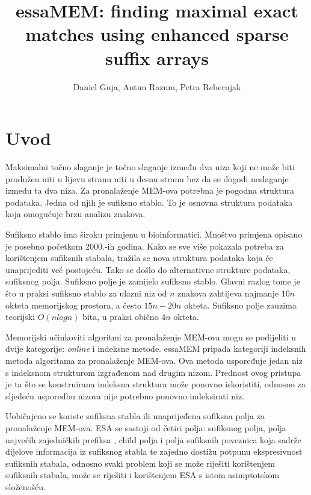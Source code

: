 \documentclass[times, utf8, seminar, numeric]{fer}
\begin{document}
\title{essaMEM: finding maximal exact matches using enhanced sparse suffix arrays}
\author{Daniel Guja, Antun Razum, Petra Rebernjak}

\maketitle
\tableofcontents

\chapter{Uvod}
Maksimalni točno slaganje  je točno slaganje između dva niza koji ne može biti produžen niti u lijevu stranu niti u desnu stranu bez da se dogodi neslaganje između ta dva niza. Za pronalaženje MEM-ova potrebna je pogodna struktura podataka. Jedna od njih je sufiksno stablo. To je osnovna struktura podataka koja omogućuje brzu analizu znakova. 

Sufiksno stablo ima široku primjenu u bioinformatici. Mnoštvo primjena opisano je posebno početkom 2000.-ih godina. Kako se sve više pokazala potreba za korištenjem sufiksnih stabala, tražila se nova struktura podataka koja će unaprijediti već postojeću. Tako se došlo do alternativne strukture podataka, sufiksnog polja. Sufiksno polje je zamijelo sufiksno stablo. Glavni razlog tome je što u praksi sufiksno stablo za ulazni niz od $n$ znakova zahtijeva najmanje $10n$ okteta memorijskog prostora, a često $15n-20n$ okteta. Sufiksno polje zauzima teorijski $O(n log n)$ bita, u praksi obično $4n$ okteta.

Memorijski učinkoviti algoritmi za pronalaženje MEM-ova mogu se podijeliti u dvije kategorije: \textit{online} i indeksne metode. essaMEM pripada kategoriji indeksnih metoda algoritama za pronalaženje MEM-ova. Ova metoda uspoređuje jedan niz s indeksnom strukturom izgrađenom nad drugim nizom. Prednost ovog pristupa je ta što se konstruirana indeksna struktura može ponovno iskoristiti, odnosno za sljedeću usporedbu nizova nije potrebno ponovno indeksirati niz. 

Uobičajeno se koriste sufiksna stabla ili unaprijeđena sufiksna polja  za pronalaženje MEM-ova. ESA se sastoji od četiri polja: sufiksnog polja, polja najvećih zajedničkih prefiksa , child polja i polja sufiksnih poveznica  koja sadrže dijelove informacija iz sufiksnog stabla te zajedno dostižu potpunu ekspresivnost sufiksnih stabala, odnosno svaki problem koji se može riješiti korištenjem sufiksnih stabala, može se riješiti i korištenjem ESA s istom asimptotskom složenošću.
\end{document}
